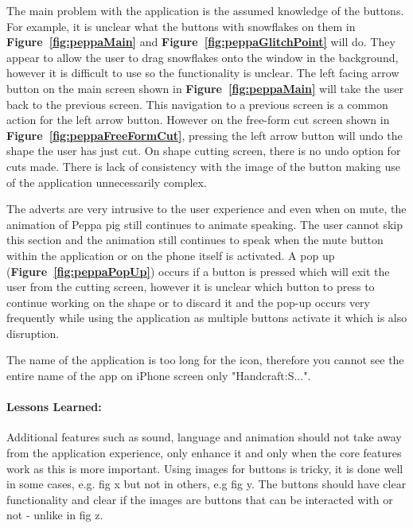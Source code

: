 \documentclass[11pt]{article}
\begin{document}
                The main problem with the application is the assumed knowledge of the buttons. For example, it is unclear what the buttons with snowflakes on them in \textbf{Figure~\ref{fig:peppaMain}} and \textbf{Figure~\ref{fig:peppaGlitchPoint}} will do. They appear to allow the user to drag snowflakes onto the window in the background, however it is difficult to use so the functionality is unclear. The left facing arrow button on the main screen shown in \textbf{Figure~\ref{fig:peppaMain}} will take the user back to the previous screen. This navigation to a previous screen is a common action for the left arrow button. However on the free-form cut screen shown in \textbf{Figure~\ref{fig:peppaFreeFormCut}}, pressing the left arrow button will undo the shape the user has just cut.
                 On shape cutting screen, there is no undo option for cuts made. There is lack of consistency with the image of the button making use of the application unnecessarily complex.
                
                The adverts are very intrusive to the user experience and even when on mute, the animation of Peppa pig still continues to animate speaking. The user cannot skip this section and the animation still continues to speak when the mute button within the application or on the phone itself is activated. A pop up (\textbf{Figure~\ref{fig:peppaPopUp}}) occurs if a button is pressed which will exit the user from the cutting screen, however it is unclear which button to press to continue working on the shape or to discard it and the pop-up occurs very frequently while using the application as multiple buttons activate it which is also disruption. 
                
                The name of the application is too long for the icon, therefore you cannot see the entire name of the app on iPhone screen only "Handcraft:S...".
                
                \paragraph{Lessons Learned:}   
                Additional features such as sound, language and animation should not take away from the application experience, only enhance it and only when the core features work as this is more important. Using images for buttons is tricky, it is done well in some cases, e.g. fig x but not in others, e.g fig y. The buttons should have clear functionality and clear if the images are buttons that can be interacted with or not - unlike in fig z. 
                
\end{document}

